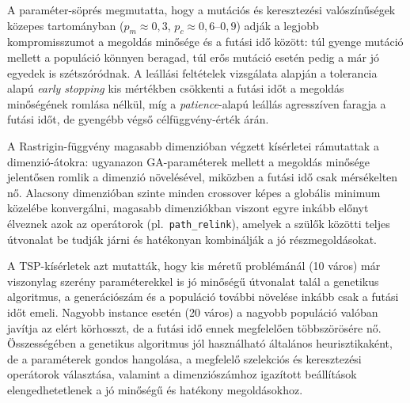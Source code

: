 \documentclass[a4paper,12pt]{article}
\begin{document}
A paraméter-söprés megmutatta, hogy a mutációs és keresztezési
valószínűségek közepes tartományban ($p_m\approx 0{,}3$,
$p_c\approx 0{,}6$--$0{,}9$) adják a legjobb kompromisszumot a
megoldás minősége és a futási idő között: túl gyenge mutáció mellett
a populáció könnyen beragad, túl erős mutáció esetén pedig a már jó
egyedek is szétszóródnak. A leállási feltételek vizsgálata alapján
a tolerancia alapú \emph{early stopping} kis mértékben csökkenti a
futási időt a megoldás minőségének romlása nélkül, míg a
\emph{patience}-alapú leállás agresszíven faragja a futási időt,
de gyengébb végső célfüggvény-érték árán.

A Rastrigin-függvény magasabb dimenzióban végzett kísérletei
rámutattak a dimenzió-átokra: ugyanazon GA-paraméterek mellett a
megoldás minősége jelentősen romlik a dimenzió növelésével,
miközben a futási idő csak mérsékelten nő. Alacsony dimenzióban
szinte minden crossover képes a globális minimum közelébe
konvergálni, magasabb dimenziókban viszont egyre inkább előnyt
élveznek azok az operátorok (pl.\ \texttt{path\_relink}), amelyek
a szülők közötti teljes útvonalat be tudják járni és hatékonyan
kombinálják a jó részmegoldásokat.

A TSP-kísérletek azt mutatták, hogy kis méretű problémánál (10 város)
már viszonylag szerény paraméterekkel is jó minőségű útvonalat talál
a genetikus algoritmus, a generációszám és a populáció további
növelése inkább csak a futási időt emeli. Nagyobb instance esetén
(20 város) a nagyobb populáció valóban javítja az elért körhosszt,
de a futási idő ennek megfelelően többszörösére nő. Összességében
a genetikus algoritmus jól használható általános heurisztikaként,
de a paraméterek gondos hangolása, a megfelelő szelekciós és
keresztezési operátorok választása, valamint a dimenziószámhoz
igazított beállítások elengedhetetlenek a jó minőségű és hatékony
megoldásokhoz.
\end{document}
